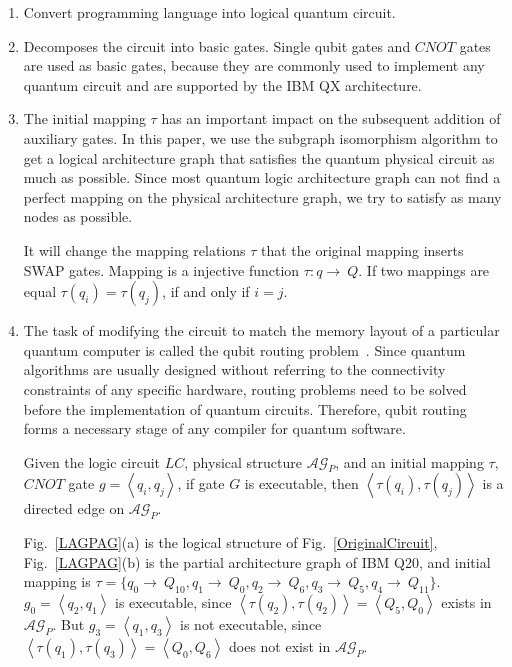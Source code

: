 \documentclass[runningheads]{llncs}
\begin{document}
\begin{enumerate}
	\item Convert programming language into logical quantum circuit.
	\item Decomposes the circuit into basic gates. 
	Single qubit gates and $CNOT$ gates are used as basic gates, 
	because they are commonly used to implement any quantum circuit 
	and are supported by the IBM QX architecture.
	\item The initial mapping $\tau$ has an important impact on the subsequent 
	addition of auxiliary gates. In this paper, we use the subgraph isomorphism 
	algorithm to get a logical architecture graph that satisfies 
	the quantum physical circuit as much as possible. Since most quantum 
	logic architecture graph can not find a perfect mapping on the physical architecture graph, 
	we try to satisfy as many nodes as possible.

	It will change the mapping relations $\tau$ that the original mapping inserts SWAP gates. 
	Mapping is a injective function
	$\tau:q \rightarrow \ Q $.
	If two mappings are equal $\tau(q_{i})=\tau(q_{j})$, if and only if $i=j$.
	\item The task of modifying the circuit to match the memory layout of 
	a particular quantum computer is called the qubit routing problem~\cite{Cowtan2019}. 
	Since quantum algorithms are usually designed without referring to 
	the connectivity constraints of any specific hardware, routing problems 
	need to be solved before the implementation of quantum circuits. 
	Therefore, qubit routing forms a necessary stage of any compiler 
	for quantum software.

	Given the logic circuit $LC$, physical structure $\mathcal{AG}_{P}$, 
	and an initial mapping $\tau$, $CNOT$ gate $g=\left \langle q_{i},q_{j}\right \rangle $, 
	if gate $G$ is executable, then $\left \langle\tau(q_{i}),\tau(q_{j})\right \rangle $ 
	is a directed edge on $\mathcal{AG}_{P}$.
\begin{example}
	Fig.~\ref{LAGPAG}(a) is the logical structure of Fig.~\ref{OriginalCircuit}, 
	Fig.~\ref{LAGPAG}(b) is the partial architecture graph of IBM Q20, and initial mapping is 
	$\tau=\{q_{0}\rightarrow \ Q_{10},q_{1}\rightarrow \ Q_{0},
			q_{2}\rightarrow \ Q_{6},q_{3}\rightarrow \ Q_{5},q_{4}\rightarrow \ Q_{11}\}$.
			$g_{0}=\left \langle q_{2},q_{1}\right \rangle $ is executable, since 
			$\left \langle \tau(q_{2}),\tau(q_{2})\right \rangle =\left \langle Q_{5},Q_{0}\right \rangle $ exists in $\mathcal{AG}_{P}$.
	But $g_{3}=\left \langle q_{1},q_{3}\right \rangle $ is not executable, since 
	$\left \langle \tau(q_{1}),\tau(q_{3})\right \rangle =\left \langle Q_{0},Q_{6}\right \rangle $  does not exist in $\mathcal{AG}_{P}$.
\end{example}

\end{enumerate}
\end{document}
